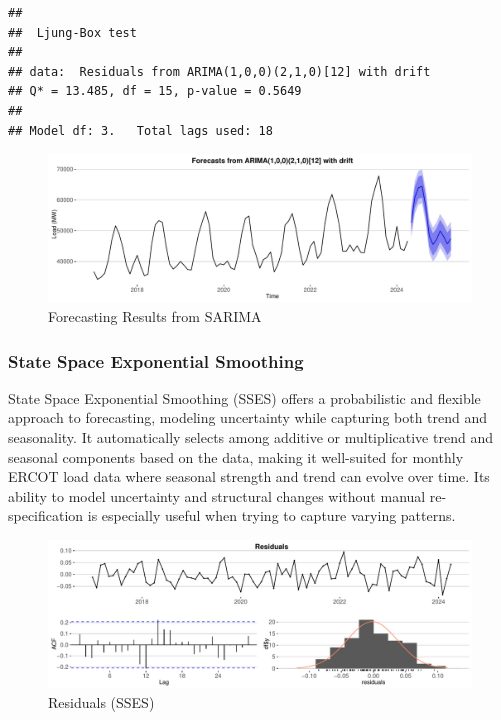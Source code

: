 \documentclass[
]{article}
\begin{document}
\begin{verbatim}
## 
##  Ljung-Box test
## 
## data:  Residuals from ARIMA(1,0,0)(2,1,0)[12] with drift
## Q* = 13.485, df = 15, p-value = 0.5649
## 
## Model df: 3.   Total lags used: 18
\end{verbatim}

\begin{figure}
\centering
\includegraphics{FinalProject_Report_files/figure-latex/unnamed-chunk-18-1.pdf}
\caption{Forecasting Results from SARIMA}
\end{figure}

\newpage

\subsubsection{State Space Exponential
Smoothing}\label{state-space-exponential-smoothing}

State Space Exponential Smoothing (SSES) offers a probabilistic and
flexible approach to forecasting, modeling uncertainty while capturing
both trend and seasonality. It automatically selects among additive or
multiplicative trend and seasonal components based on the data, making
it well-suited for monthly ERCOT load data where seasonal strength and
trend can evolve over time. Its ability to model uncertainty and
structural changes without manual re-specification is especially useful
when trying to capture varying patterns.

\begin{figure}
\centering
\includegraphics{FinalProject_Report_files/figure-latex/unnamed-chunk-19-1.pdf}
\caption{Residuals (SSES)}
\end{figure}
\end{document}

